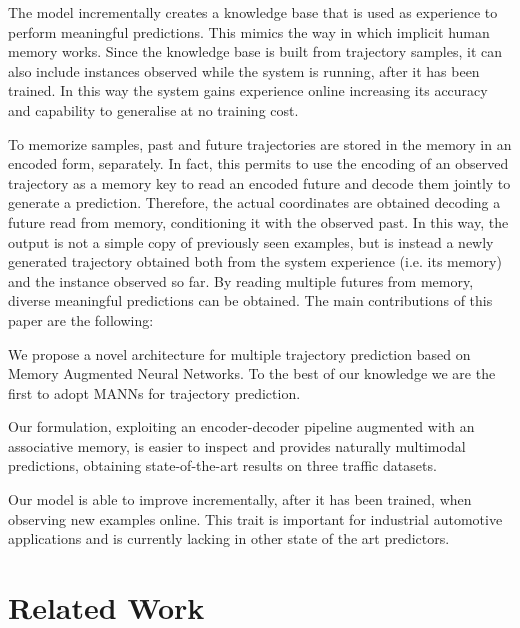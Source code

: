 \documentclass[10pt,twocolumn,letterpaper]{article}
\newenvironment{tight_itemize}{
	\begin{itemize}[leftmargin=8pt]
		\setlength{\topsep}{0pt}
		\setlength{\itemsep}{0pt}
		\setlength{\parskip}{0pt}
		\setlength{\parsep}{0pt}
	}{\end{itemize}}
\begin{document}
The model incrementally creates a knowledge base that is used as experience to perform meaningful predictions. This mimics the way in which implicit human memory works. Since the knowledge base is built from trajectory samples, it can also include instances observed while the system is running, after it has been trained. In this way the system gains experience online increasing its accuracy and capability to generalise at no training cost.

To memorize samples, past and future trajectories are stored in the memory in an encoded form, separately. In fact, this permits to use the encoding of an observed trajectory as a memory key to read an encoded future and decode them jointly to generate a prediction. 
Therefore, the actual coordinates are obtained decoding a future read from memory, conditioning it with the observed past. In this way, the output is not a simple copy of previously seen examples, but is instead a newly generated trajectory obtained both from the system experience (i.e. its memory) and the instance observed so far. By reading multiple futures from memory, diverse meaningful predictions can be obtained. 
The main contributions of this paper are the following:
\vspace{-5pt}
\begin{tight_itemize}
	\setlength\itemsep{2px}
	\item We propose a novel architecture for multiple trajectory prediction based on Memory Augmented Neural Networks. To the best of our knowledge we are the first to adopt MANNs for trajectory prediction.
	\item Our formulation, exploiting an encoder-decoder pipeline augmented with an associative memory, is easier to inspect and provides naturally multimodal predictions, obtaining state-of-the-art results on three traffic datasets.
	\item Our model is able to improve incrementally, after it has been trained, when observing new examples online. This trait is important for industrial automotive applications and is currently lacking in other state of the art predictors.
\end{tight_itemize}



\section{Related Work}
\end{document}

